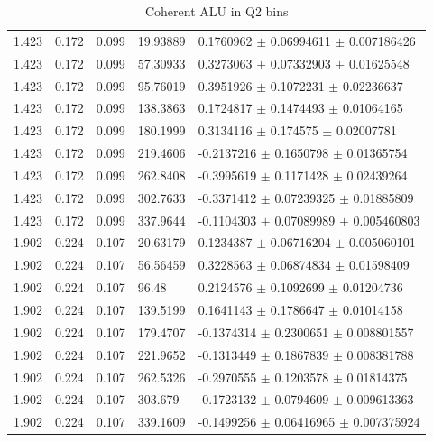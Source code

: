 \begin{table}[!h]
\begin{center}
\begin{tabular}{||l|l|l|l|l||}
         1.423 & 0.172 & 0.099 & 19.93889  & 0.1760962  $\pm$ 0.06994611  $\pm$ 
0.007186426   \\
         1.423 & 0.172 & 0.099 & 57.30933  & 0.3273063  $\pm$ 0.07332903  $\pm$ 0.01625548    \\
         1.423 & 0.172 & 0.099 & 95.76019  & 0.3951926  $\pm$ 0.1072231   $\pm$ 0.02236637    \\
         1.423 & 0.172 & 0.099 & 138.3863   & 0.1724817  $\pm$ 0.1474493   
$\pm$ 0.01064165    \\
         1.423 & 0.172 & 0.099 & 180.1999  & 0.3134116  $\pm$ 0.174575    $\pm$ 
0.02007781\\
         1.423 & 0.172 & 0.099 & 219.4606  & -0.2137216 $\pm$ 0.1650798   $\pm$ 0.01365754    \\
         1.423 & 0.172 & 0.099 & 262.8408  & -0.3995619 $\pm$ 0.1171428   $\pm$ 0.02439264    \\
         1.423 & 0.172 & 0.099 & 302.7633  & -0.3371412 $\pm$ 0.07239325  $\pm$ 0.01885809    \\
         1.423 & 0.172 & 0.099 & 337.9644  & -0.1104303 $\pm$ 0.07089989  $\pm$ 0.005460803   \\

         \hline
         1.902 & 0.224 & 0.107 &    20.63179 &  0.1234387 $\pm$   0.06716204 
$\pm$   0.005060101   \\
         1.902 & 0.224 & 0.107 &    56.56459 &  0.3228563 $\pm$   0.06874834 $\pm$   0.01598409    \\
         1.902 & 0.224 & 0.107 &    96.48    &  0.2124576 $\pm$   0.1092699  $\pm$    0.01204736   \\
         1.902 & 0.224 & 0.107 &    139.5199 &  0.1641143 $\pm$   0.1786647  $\pm$    0.01014158   \\
         1.902 & 0.224 & 0.107 &    179.4707 & -0.1374314 $\pm$   0.2300651  $\pm$    0.008801557  \\
         1.902 & 0.224 & 0.107 &    221.9652 & -0.1313449 $\pm$   0.1867839  $\pm$    0.008381788  \\
         1.902 & 0.224 & 0.107 &    262.5326 & -0.2970555 $\pm$   0.1203578  $\pm$    0.01814375   \\
         1.902 & 0.224 & 0.107 &    303.679  & -0.1723132 $\pm$   0.0794609  $\pm$    0.009613363  \\
         1.902 & 0.224 & 0.107 &    339.1609 & -0.1499256 $\pm$   0.06416965 $\pm$   0.007375924   \\

      \hline 
      \hline
      \end{tabular}
      \caption{ Coherent ALU in Q2 bins}
      \label{table:Coh_Q2_BSA}
   \end{center}
\end{table}                    

